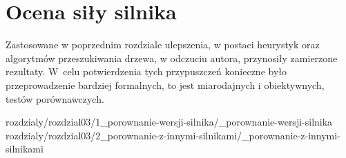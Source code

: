 
\chapter {Ocena siły silnika}
\label {ch: ocena-sily-silnika}

Zastosowane w poprzednim rozdziale ulepszenia, w postaci heurystyk oraz algorytmów przeszukiwania drzewa, w odczuciu autora, przynosiły zamierzone rezultaty.
W~celu potwierdzenia tych przypuszczeń konieczne było przeprowadzenie bardziej formalnych, to jest miarodajnych i obiektywnych, testów porównawczych.

 {rozdzialy/rozdzial03/1_porownanie-wersji-silnika/_porownanie-wersji-silnika}
 {rozdzialy/rozdzial03/2_porownanie-z-innymi-silnikami/_porownanie-z-innymi-silnikami}


